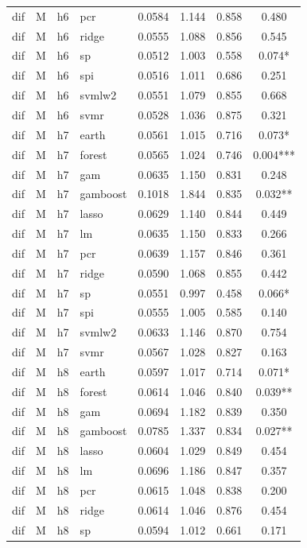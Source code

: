 \begin{ThreePartTable}
\begin{longtable}[t]{llclcccc}
dif & M & h6 & pcr & 0.0584 & 1.144 & 0.858 & 0.480\\
dif & M & h6 & ridge & 0.0555 & 1.088 & 0.856 & 0.545\\
dif & M & h6 & sp & 0.0512 & 1.003 & 0.558 & 0.074*\\
dif & M & h6 & spi & 0.0516 & 1.011 & 0.686 & 0.251\\
dif & M & h6 & svmlw2 & 0.0551 & 1.079 & 0.855 & 0.668\\
dif & M & h6 & svmr & 0.0528 & 1.036 & 0.875 & 0.321\\
\addlinespace
dif & M & h7 & earth & 0.0561 & 1.015 & 0.716 & 0.073*\\
dif & M & h7 & forest & 0.0565 & 1.024 & 0.746 & 0.004***\\
dif & M & h7 & gam & 0.0635 & 1.150 & 0.831 & 0.248\\
dif & M & h7 & gamboost & 0.1018 & 1.844 & 0.835 & 0.032**\\
dif & M & h7 & lasso & 0.0629 & 1.140 & 0.844 & 0.449\\
dif & M & h7 & lm & 0.0635 & 1.150 & 0.833 & 0.266\\
dif & M & h7 & pcr & 0.0639 & 1.157 & 0.846 & 0.361\\
dif & M & h7 & ridge & 0.0590 & 1.068 & 0.855 & 0.442\\
dif & M & h7 & sp & 0.0551 & 0.997 & 0.458 & 0.066*\\
dif & M & h7 & spi & 0.0555 & 1.005 & 0.585 & 0.140\\
dif & M & h7 & svmlw2 & 0.0633 & 1.146 & 0.870 & 0.754\\
dif & M & h7 & svmr & 0.0567 & 1.028 & 0.827 & 0.163\\
\addlinespace
dif & M & h8 & earth & 0.0597 & 1.017 & 0.714 & 0.071*\\
dif & M & h8 & forest & 0.0614 & 1.046 & 0.840 & 0.039**\\
dif & M & h8 & gam & 0.0694 & 1.182 & 0.839 & 0.350\\
dif & M & h8 & gamboost & 0.0785 & 1.337 & 0.834 & 0.027**\\
dif & M & h8 & lasso & 0.0604 & 1.029 & 0.849 & 0.454\\
dif & M & h8 & lm & 0.0696 & 1.186 & 0.847 & 0.357\\
dif & M & h8 & pcr & 0.0615 & 1.048 & 0.838 & 0.200\\
dif & M & h8 & ridge & 0.0614 & 1.046 & 0.876 & 0.454\\
dif & M & h8 & sp & 0.0594 & 1.012 & 0.661 & 0.171\\

\end{longtable}
\end{ThreePartTable}
